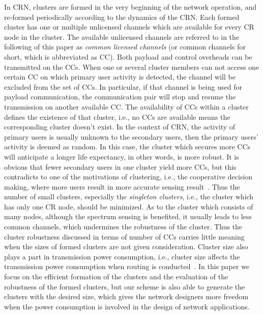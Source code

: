 \documentclass[10pt,journal,compsoc]{IEEEtran}
\theoremstyle{mytheoremstyle}
\theoremstyle{mytheoremstyle}
\theoremstyle{mytheoremstyle}
\newcommand{\ie}{i.e., }
\begin{document}
In CRN, clusters are formed in the very beginning of the network operation, and re-formed periodically according to the dynamics of the CRN.
Each formed cluster has one or multiple unlicensed channels which are available for every CR node in the cluster.
The available unlicensed channels are referred to in the following of this paper as \textit{common licensed channels} (or common channels for short, which is abbreviated as CC).
Both payload and control overheads can be transmitted on the CCs.
When one or several cluster members can not access one certain CC on which primary user activity is detected, the channel will be excluded from the set of CCs.
In particular, if that channel is being used for payload communication, the communication pair will stop and resume the transmission on another available CC.
The availability of CCs within a cluster defines the existence of that cluster, \ie no CCs are available means the corresponding cluster doesn't exist.
In the context of CRN, the activity of primary users is usually unknown to the secondary users, then the primary users' activity is deemed as random.
In this case, the cluster which secures more CCs will anticipate a longer life expectancy, in other words, is more robust.
It is obvious that fewer secondary users in one cluster yield more CCs, but this contradicts to one of the motivations of clustering, \ie the cooperative decision making, where more users result in more accurate sensing result~\cite{Consensus_based_clustering12}.
Thus the number of small clusters, especially the \textit{singleton clusters}, \ie the cluster which has only one CR node, should be minimized.
As to the cluster which consists of many nodes, although the spectrum sensing is benefited, it usually leads to less common channels, which undermines the robustness of the cluster.
Thus the cluster robustness discussed in terms of number of CCs carries little meaning when the sizes of formed clusters are not given consideration.
Cluster size also plays a part in transmission power consumption, \ie cluster size affects the transmission power consumption when routing is conducted~\cite{clustering_globecom11, EnergyEfficientClusteringRouting_2015}.
In this paper we focus on the efficient formation of the clusters and the evaluation of the robustness of the formed clusters, but our scheme is also able to generate the clusters with the desired size, which gives the network designers more freedom when the power consumption is involved in the design of network applications.
\end{document}
